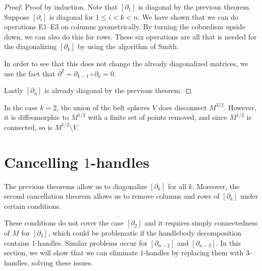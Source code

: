 \begin{proof}
    Proof by induction.
    Note that $[\partial_1]$ is diagonal by the previous theorem.
    Suppose $[\partial_i]$ is diagonal for  $1 \le  i < k < n$.
    We have shown that we can do operations E1--E3 on columns geometrically.
    By turning the cobordism upside down, we can also do this for rows.
    These six operations are all that is needed for the diagonalizing $[\partial_k]$ by using the algorithm of Smith.

    In order to see that this does not change the already diagonalized matrices, we use the fact that $\partial^2 = \partial_{k-1} \circ \partial_{k} = 0$.

    Lastly $[\partial_n]$ is already diagonal by the previous theorem.
\end{proof}

\begin{marginfigure}
    \centering
    \caption{In the case $k = 2$, the union of the belt spheres $V$ does disconnect $M^{3 / 2}$. However, it is diffeomorphic to $M^{ 1 / 2}$ with a finite set of points removed, and since $M^{ 1 / 2}$ is connected, so is  $M^{ 1 / 2} \setminus V$.}
    \label{fig:proof-e1-e2-e3-disconnect-case}
\end{marginfigure}


\section{Cancelling $1$-handles}
The previous theorems allow us to diagonalize $[\partial_k]$ for all $k$.
Moreover, the second cancellation theorem allows us to remove columns and rows of $[\partial_k]$ under certain conditions.

These conditions do not cover the case $[\partial_2]$ and it requires simply connectedness of $M$ for  $[\partial_3]$, which could be problematic if the handlebody decomposition contains  $1$-handles.
Similar problems occur for $[\partial_{n-2}]$ and $[\partial_{n-3}]$.
In this section, we will show that we can eliminate $1$-handles by replacing them with $3$-handles, solving these issues.

